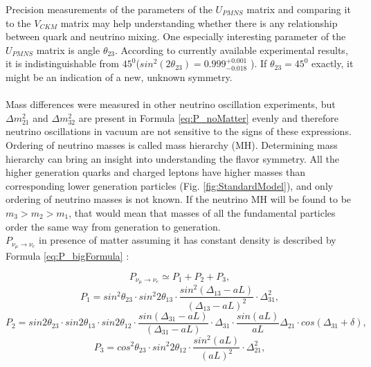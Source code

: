 Precision measurements of the parameters of the $U_{PMNS}$ matrix and comparing it to the $V_{CKM}$ matrix may help understanding whether there is any relationship between quark and neutrino mixing. One especially interesting parameter of the $U_{PMNS}$ matrix is angle $\theta_{23}$. According to currently available experimental results, it is indistinguishable from $45^0$($sin^2(2\theta_{23})=0.999^{+0.001}_{-0.018}$ \cite{ref_PDG}). If $\theta_{23}=45^0$ exactly, it might be an indication of a new, unknown symmetry.\\ \\
Mass differences were measured in other neutrino oscillation experiments, but ${\Delta}m_{21}^2$ and ${\Delta}m_{32}^2$ are present in Formula \ref{eq:P_noMatter} evenly and therefore neutrino oscillations in vacuum are not sensitive to the signs of these expressions. Ordering of neutrino masses is called mass hierarchy (MH). Determining mass hierarchy can bring an insight into understanding the flavor symmetry. All the higher generation quarks and charged leptons have higher masses than corresponding lower generation particles (Fig. \ref{fig:StandardModel}), and only ordering of neutrino masses is not known. If the neutrino MH will be found to be $m_3>m_2>m_1$, that would mean that masses of all the fundamental particles order the same way from generation to generation. \\
$P_{\nu_\mu \rightarrow \nu_e}$ in presence of matter assuming it has constant density is described by Formula \ref{eq:P_bigFormula} \cite{ref_theory_Osc}: \\
\begin{center}
\begin{equation}
\label{eq:P_bigFormula}
P_{\nu_\mu \rightarrow \nu_e} \simeq P_1 + P_2 + P_3, 
\end{equation}
\begin{equation}
\label{eq:P_bigFormula_1}
P_1 = sin^2{\theta_{23}} \cdot sin^2{2\theta_{13}} \cdot \frac{sin^2(\Delta_{13}-aL)}{(\Delta_{13}-aL)^2} \cdot \Delta^2_{31},
\end{equation}
\begin{equation}
\label{eq:P_bigFormula_2}
P_2 = sin2\theta_{23} \cdot sin2\theta_{13} \cdot sin2\theta_{12} \cdot \frac{sin(\Delta_{31}-aL)}{(\Delta_{31}-aL)} \cdot \Delta_{31} \cdot \frac{sin(aL)}{aL}\Delta_{21} \cdot cos(\Delta_{31}+\delta),
\end{equation}
\begin{equation}
\label{eq:P_bigFormula_3}
P_3 = cos^2\theta_{23} \cdot sin^2{2\theta_{12}} \cdot \frac{sin^2(aL)}{(aL)^2} \cdot \Delta^2_{21},
\end{equation}
\end{center}
